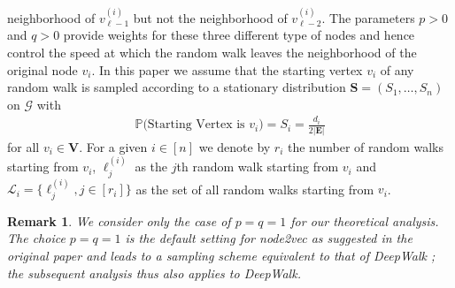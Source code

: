 \documentclass[10pt,journal,compsoc]{IEEEtran}
\newcommand*{\p}{\mathbb{P}}
\newcommand{\ee}{\end{aligned} \end{equation}}
\newcommand{\bds}{\boldsymbol}
\newtheorem{remark}{Remark}
\newcommand{\bee}{\begin{equation}\begin{aligned}}
\numberwithin{equation}{section}
\begin{document}
\begin{enumerate}
  neighborhood of $v_{\ell-1}^{(i)}$ but not the neighborhood of
  $v_{\ell-2}^{(i)}$. The parameters $p > 0$ and $q > 0$ provide weights for these three different type of nodes and hence control the speed at
  which the random walk leaves the neighborhood of the original node
  $v_i$. 
In this paper we assume that the starting
  vertex $v_i$ of any random walk is sampled according to a
  stationary distribution $\mathbf{S} = (S_1, \dots, S_n)$ on $\mathcal{G}$ with
\bee
\p\big(\text{Starting Vertex is } v_i\big) = S_i =\frac{d_{i}}{2|\mathbf{E}|}
\ee 
for all $v_i \in \mathbf{V}$. For a given $i \in [n]$ we denote by $r_i$ the number of random walks starting from $v_i$, $\bds{\ell}^{(i)}_{j}$ as the $j$th random walk starting from $v_i$ and $\mathcal{L}_{i} = \{\bds{\ell}^{(i)}_{j} , j\in [r_i]\}$ as the set of all random walks starting from $v_i$. %

\begin{remark}
{\upshape We consider only the case of $p = q = 1$ for our
theoretical analysis. The choice $p = q = 1$ is
the default setting for node2vec as suggested in
the original paper \cite{grover2016node2vec} and leads to a sampling scheme
equivalent to that of DeepWalk \cite{perozzi2014deepwalk}; 
the subsequent analysis thus also applies to DeepWalk.}
\end{remark}


\end{enumerate}
\end{document}
